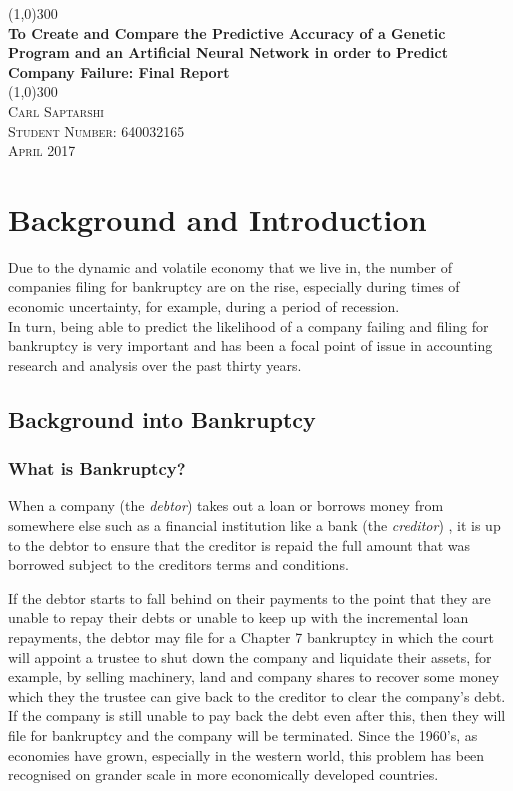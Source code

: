 \documentclass[11pt]{article}
\begin{document}
	\begin{titlepage}
		\begin{center}
			\line(1,0){300}\\
			[0.25in]
			\huge{\bfseries To Create and Compare the Predictive Accuracy of a Genetic Program and an Artificial Neural Network in order to Predict Company Failure: Final Report}\\
			\line(1,0){300}\\
			[1.5cm]
			
			 \textsc{Carl Saptarshi}\\
			 \textsc{\large  Student Number: 640032165 \\
			 April 2017}
			 
		\end{center}
	\end{titlepage}

\tableofcontents
\thispagestyle{empty}
\cleardoublepage
\setcounter{page}{1}
\section{Background and Introduction }\label{sec:intro}
Due to the dynamic and volatile economy that we live in, the number of companies filing for bankruptcy are on the rise, especially during times of economic uncertainty, for example, during a period of recession.\\
In turn, being able to predict the likelihood of a company failing and filing for bankruptcy is very important and has been a focal point of issue in accounting research and analysis over the past thirty years. 

\subsection{Background into Bankruptcy}
\subsubsection{What is Bankruptcy? }\label{sec:bankdef}
When a company (the \textit{debtor}) takes out a loan or borrows money from somewhere else such as a financial institution like a bank (the \textit{creditor}) , it is up to the debtor to ensure that the creditor is repaid the full amount that was borrowed subject to the creditors terms and conditions.


If the debtor starts to fall behind on their payments to the point that they are unable to repay their debts or unable to keep up with the incremental loan repayments, the debtor may file for a Chapter 7 bankruptcy in which the court will appoint a trustee to shut down the company and liquidate their assets, for example, by selling machinery, land and company shares to recover some money which they the trustee can give back to the creditor to clear the company's debt. If the company is still unable to pay back the debt even after this, then they will file for bankruptcy and the company will be terminated. Since the 1960's, as economies have grown, especially in the western world, this problem has been recognised on grander scale in more economically developed countries.
\end{document}
